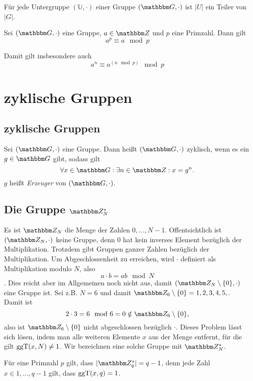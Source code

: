  \begin{theorem}
   Für jede Untergruppe $(\mathbb{U}, \cdot)$ einer Gruppe $(\G, \cdot)$
   ist $|U|$ ein Teiler von $|G|$.   
 \end{theorem}

 \begin{theorem}
   Sei $(\G, \cdot)$ eine Gruppe, $a \in \Z{}$ und $p$ eine
   Primzahl. Dann gilt
   \[a^p \equiv a \mod p\]
 \end{theorem}
Damit gilt insbesondere auch
\[a^n \equiv a^{(n \mod p)} \mod p\]
\section{zyklische Gruppen}

\subsection{zyklische Gruppen}
\begin{definition}
  Sei $(\G, \cdot)$ eine Gruppe. Dann heißt $(\G, \cdot)$ zyklisch, wenn
  es ein $g \in \G$ gibt, sodass gilt
\[
  \forall x \in \G: \exists n \in \Z{}: x=g^n.
\]
$g$ heißt \textit{Erzeuger} von $(\G, \cdot)$.
\end{definition}

\subsection{Die Gruppe $\Z{N}^*$}
Es ist $\Z{N}$ die Menge der Zahlen ${0,\dots , N-1}$. Offentsichtlich
ist $(\Z{N}, \cdot)$ keine Gruppe, denn $0$ hat kein inverses Element
bezüglich der Multiplikation.
Trotzdem gibt Gruppen ganzer Zahlen bezüglich der
Multiplikation. Um Abgeschlossenheit zu erreichen, wird $\cdot$
definiert als Multiplikation modulo $N$, also 
\[a \cdot b = ab \mod N\]. Dies reicht aber im Allgemeinen noch nicht
aus, damit $(\Z{N}\setminus \{0\}, \cdot)$ eine Gruppe ist. Sei z.B. $N=6$ und
damit $\Z{6}\setminus \{0\} = {1,2,3,4,5,}$. Damit ist 
\[
2 \cdot 3 = 6 \mod 6 = 0 \notin \Z{6}\setminus \{0\},
\]
also ist $\Z{6}\setminus \{0\}$ nicht abgeschlossen bezüglich $\cdot$. 
Dieses Problem lässt sich lösen, indem man alle weiteren Elemente $x$ aus
der Menge entfernt, für die gilt $\operatorname{ggT}(x, N)\neq 1$. Wir bezeichnen eine
solche Gruppe mit $\Z{N}^*$. 

Für eine Primzahl $p$ gilt, dass  $|\Z{q}^*|= q-1$, denn jede Zahl $x\in
{1,..., q-1}$ gilt, dass $\operatorname{ggT}(x, q)=1$.